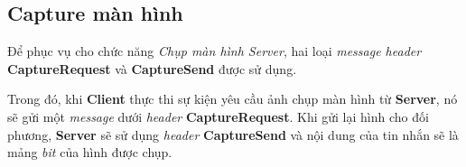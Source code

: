 \subsection{Capture màn hình}

Để phục vụ cho chức năng \textit{Chụp màn hình Server}, hai loại \textit{message header} \textbf{CaptureRequest} và \textbf{CaptureSend} được sử dụng.

Trong đó, khi \textbf{Client} thực thi sự kiện yêu cầu ảnh chụp màn hình từ \textbf{Server}, nó sẽ gửi một \textit{message} dưới \textit{header} \textbf{CaptureRequest}. Khi gửi lại hình cho đối phương, \textbf{Server} sẽ sử dụng \textit{header} \textbf{CaptureSend}  và nội dung của tin nhắn sẽ là mảng \textit{bit} của hình được chụp.


